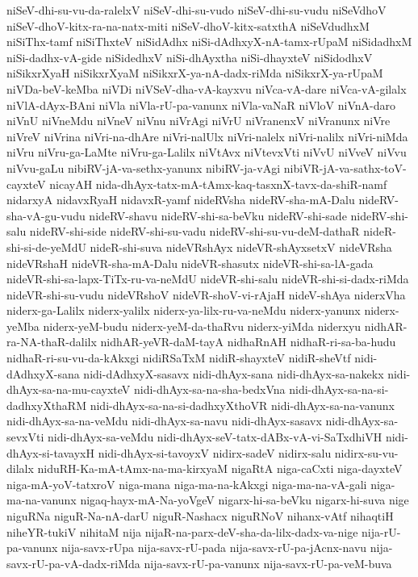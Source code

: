 {niSeV-dhi-su-vu-da-ralelxV
niSeV-dhi-su-vudo
niSeV-dhi-su-vudu
niSeVdhoV
niSeV-dhoV-kitx-ra-na-natx-miti
niSeV-dhoV-kitx-satxthA
niSeVdudhxM
niSiThx-tamf
niSiThxteV
niSidAdhx
niSi-dAdhxyX-nA-tamx-rUpaM
niSidadhxM
niSi-dadhx-vA-gide
niSidedhxV
niSi-dhAyxtha
niSi-dhayxteV
niSidodhxV
niSikxrXyaH
niSikxrXyaM
niSikxrX-ya-nA-dadx-riMda
niSikxrX-ya-rUpaM
niVDa-beV-keMba
niVDi
niVSeV-dha-vA-kayxvu
niVca-vA-dare
niVca-vA-gilalx
niVlA-dAyx-BAni
niVla
niVla-rU-pa-vanunx
niVla-vaNaR
niVloV
niVnA-daro
niVnU
niVneMdu
niVneV
niVnu
niVrAgi
niVrU
niVranenxV
niVranunx
niVre
niVreV
niVrina
niVri-na-dhAre
niVri-nalUlx
niVri-nalelx
niVri-nalilx
niVri-niMda
niVru
niVru-ga-LaMte
niVru-ga-Lalilx
niVtAvx
niVtevxVti
niVvU
niVveV
niVvu
niVvu-gaLu
nibiRV-jA-va-sethx-yanunx
nibiRV-ja-vAgi
nibiVR-jA-va-sathx-toV-cayxteV
nicayAH
nida-dhAyx-tatx-mA-tAmx-kaq-tasxnX-tavx-da-shiR-namf
nidarxyA
nidavxRyaH
nidavxR-yamf
nideRVsha
nideRV-sha-mA-Dalu
nideRV-sha-vA-gu-vudu
nideRV-shavu
nideRV-shi-sa-beVku
nideRV-shi-sade
nideRV-shi-salu
nideRV-shi-side
nideRV-shi-su-vadu
nideRV-shi-su-vu-deM-dathaR
nideR-shi-si-de-yeMdU
nideR-shi-suva
nideVRshAyx
nideVR-shAyxsetxV
nideVRsha
nideVRshaH
nideVR-sha-mA-Dalu
nideVR-shasutx
nideVR-shi-sa-lA-gada
nideVR-shi-sa-lapx-TiTx-ru-va-neMdU
nideVR-shi-salu
nideVR-shi-si-dadx-riMda
nideVR-shi-su-vudu
nideVRshoV
nideVR-shoV-vi-rAjaH
nideV-shAya
niderxVha
niderx-ga-Lalilx
niderx-yalilx
niderx-ya-lilx-ru-va-neMdu
niderx-yanunx
niderx-yeMba
niderx-yeM-budu
niderx-yeM-da-thaRvu
niderx-yiMda
niderxyu
nidhAR-ra-NA-thaR-dalilx
nidhAR-yeVR-daM-tayA
nidhaRnAH
nidhaR-ri-sa-ba-hudu
nidhaR-ri-su-vu-da-kAkxgi
nidiRSaTxM
nidiR-shayxteV
nidiR-sheVtf
nidi-dAdhxyX-sana
nidi-dAdhxyX-sasavx
nidi-dhAyx-sana
nidi-dhAyx-sa-nakekx
nidi-dhAyx-sa-na-mu-cayxteV
nidi-dhAyx-sa-na-sha-bedxVna
nidi-dhAyx-sa-na-si-dadhxyXthaRM
nidi-dhAyx-sa-na-si-dadhxyXthoVR
nidi-dhAyx-sa-na-vanunx
nidi-dhAyx-sa-na-veMdu
nidi-dhAyx-sa-navu
nidi-dhAyx-sasavx
nidi-dhAyx-sa-sevxVti
nidi-dhAyx-sa-veMdu
nidi-dhAyx-seV-tatx-dABx-vA-vi-SaTxdhiVH
nidi-dhAyx-si-tavayxH
nidi-dhAyx-si-tavoyxV
nidirx-sadeV
nidirx-salu
nidirx-su-vu-dilalx
niduRH-Ka-mA-tAmx-na-ma-kirxyaM
nigaRtA
niga-caCxti
niga-dayxteV
niga-mA-yoV-tatxroV
niga-mana
niga-ma-na-kAkxgi
niga-ma-na-vA-gali
niga-ma-na-vanunx
nigaq-hayx-mA-Na-yoVgeV
nigarx-hi-sa-beVku
nigarx-hi-suva
nige
niguRNa
niguR-Na-nA-darU
niguR-Nashacx
niguRNoV
nihanx-vAtf
nihaqtiH
niheYR-tukiV
nihitaM
nija
nijaR-na-parx-deV-sha-da-lilx-dadx-va-nige
nija-rU-pa-vanunx
nija-savx-rUpa
nija-savx-rU-pada
nija-savx-rU-pa-jAcnx-navu
nija-savx-rU-pa-vA-dadx-riMda
nija-savx-rU-pa-vanunx
nija-savx-rU-pa-veM-buva
}
